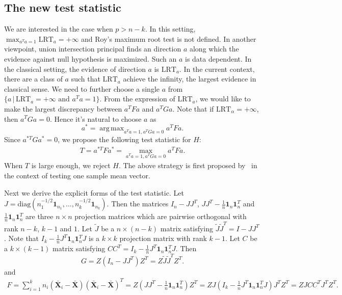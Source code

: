 \documentclass[review]{elsarticle}
\DeclareMathOperator*{\argmax}{arg\,max}
\theoremstyle{plain}
\theoremstyle{definition}
\theoremstyle{remark}
\begin{document}
\subsection{The new test statistic}
We are interested in the case when $p> n-k$.
In this setting, $\max_{a^T a=1}\text{LRT}_a=+\infty$ and Roy's maximum root test is not defined. 
In another viewpoint, union intersection principal finds an direction $a$ along which the evidence against null hypothesis is maximized.
Such an $a$ is data dependent.
In the classical setting, the evidence of direction $a$ is $\text{LRT}_a$.
In the current context, there are a class of $a$ such that $\text{LRT}_a$ achieve the infinity, the largest evidence in classical sense.
We need to further choose a single $a$ from $\{a\,|\,\text{LRT}_a=+\infty\text{ and }a^T a =1\}$.
 From the expression of $\text{LRT}_a$, we would like to make the largest discrepancy between $a^T F a$ and $a^T G a$.
Note that if $\text{LRT}_{\alpha}=+\infty$, then $a^T G a=0$.
Hence it's natural to choose $a$ as
$$
        a^{*}=
        \argmax_{a^T a=1, a^T G a=0} 
        a^T F a.
$$
Since $a^{*T}G a^*=0$, we propose the following test statistic for $H$:
\begin{equation*}
    \begin{aligned}
        T=a^{*T} F a^*
        =
        \max_{a^T a=1, a^T G a=0} 
        a^T F a.
    \end{aligned}
\end{equation*}
When $T$ is large enough, we reject $H$.
The above strategy is first proposed by~\cite{Zhao2016A} in the context of testing one sample mean vector.


Next we derive the explicit forms of the test statistic. 
Let $J=\mathrm{diag}(n_1^{-1/2}\mathbf{1}_{n_1},\ldots,n_k^{-1/2}\mathbf{1}_{n_k})$.
Then the matrices $I_n-JJ^T$, $JJ^T-\frac{1}{n}\mathbf{1}_n\mathbf{1}_n^T$ and $\frac{1}{n}\mathbf{1}_n\mathbf{1}_n^T$ are three $n\times n$ projection matrices which are pairwise orthogonal with rank $n-k$, $k-1$ and $1$.
Let $\tilde{J}$ be a $n\times (n-k)$ matrix satisfying $\tilde{J}\tilde{J}^T =I-JJ^T$.
Note that $I_k-\frac{1}{n}J^T\mathbf{1}_n \mathbf{1}_n^T J$ is a $k\times k$ projection matrix with rank $k-1$.
Let $C$ be a $k\times (k-1)$ matrix satisfying $CC^T=I_k-\frac{1}{n}J^T\mathbf{1}_n \mathbf{1}_n^T J$.
Then 
$$
G=Z(I_n-JJ^T)Z^T=
Z\tilde{J}\tilde{J}^T Z^T.
$$
and
\begin{equation*}
    \begin{aligned}
        F=\sum_{i=1}^k n_i (\bar{\mathbf{X}}_i-\bar{\mathbf{X}})(\bar{\mathbf{X}}_i-\bar{\mathbf{X}})^T 
        =Z(JJ^T-\frac{1}{n}\mathbf{1}_n\mathbf{1}_n^T)Z^T
=ZJ(I_k-\frac{1}{n}J^T\mathbf{1}_n \mathbf{1}_n^T J)J^T Z^T
=ZJC C^T J^T Z^T.
    \end{aligned}
\end{equation*}
\end{document}
